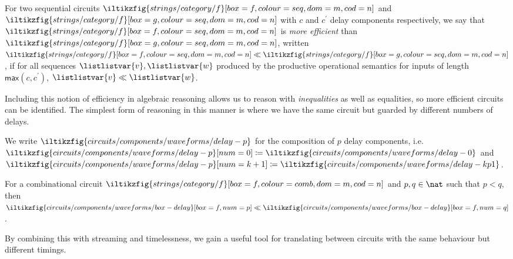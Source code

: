 \documentclass{lmcs}
\begin{document}
\begin{defi}
    For two sequential circuits \(
    \iltikzfig{strings/category/f}[box=f,colour=seq,dom=m,cod=n]
    \) and \(
    \iltikzfig{strings/category/f}[box=g,colour=seq,dom=m,cod=n]
    \) with \(c\) and \(c^\prime\) delay components respectively, we say that \(
    \iltikzfig{strings/category/f}[box=f,colour=seq,dom=m,cod=n]
    \) is \emph{more efficient} than \(
    \iltikzfig{strings/category/f}[box=g,colour=seq,dom=m,cod=n]
    \), written \(
    \iltikzfig{strings/category/f}[box=f,colour=seq,dom=m,cod=n]
    \ll
    \iltikzfig{strings/category/f}[box=g,colour=seq,dom=m,cod=n]
    \), if for all sequences \(\listlistvar{v},\listlistvar{w}\) produced by the
    productive operational semantics for inputs of length
    \(\mathsf{max}(c,c^\prime)\), \(\listlistvar{v} \ll \listlistvar{w}\).
\end{defi}

Including this notion of efficiency in algebraic reasoning allows us to reason
with \emph{inequalities} as well as equalities, so more efficient circuits can
be identified.
The simplest form of reasoning in this manner is where we have the
same circuit but guarded by different numbers of delays.

\begin{nota}
    We write \(
    \iltikzfig{circuits/components/waveforms/delay-p}
    \) for the composition of \(p\) delay components, i.e.\ \(
    \iltikzfig{circuits/components/waveforms/delay-p}[num=0]
    \coloneqq
    \iltikzfig{circuits/components/waveforms/delay-0}
    \) and \(
    \iltikzfig{circuits/components/waveforms/delay-p}[num=k+1]
    \coloneqq
    \iltikzfig{circuits/components/waveforms/delay-kp1}
    \).
\end{nota}

\begin{lem}
    For a combinational circuit \(
    \iltikzfig{strings/category/f}[box=f,colour=comb,dom=m,cod=n]
    \) and \(p,q \in \nat\) such that \(p < q\), then \(
    \iltikzfig{circuits/components/waveforms/box-delay}[box=f,num=p]
    \ll
    \iltikzfig{circuits/components/waveforms/box-delay}[box=f,num=q]
    \).
\end{lem}

By combining this with streaming and timelessness, we gain a useful tool for
translating between circuits with the same behaviour but different timings.
\end{document}
